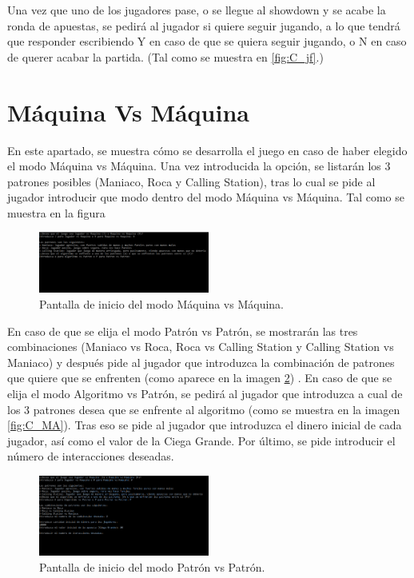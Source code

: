 Una vez que uno de los jugadores pase, o se llegue al showdown y se acabe la ronda de apuestas, se pedirá al jugador si quiere seguir jugando, a lo que tendrá que responder escribiendo Y en caso de que se quiera seguir jugando, o N en caso de querer acabar la partida. (Tal como se muestra en \ref{fig:C_jf}.)

\clearpage

\section{Máquina Vs Máquina}

En este apartado, se muestra cómo se desarrolla el juego en caso de haber elegido el modo Máquina vs Máquina. Una vez introducida la opción, se listarán los 3 patrones posibles (Maniaco, Roca y Calling Station), tras lo cual se pide al jugador introducir que modo dentro del modo Máquina vs Máquina. Tal como se muestra en la figura

\begin{figure}[h]
\centering
\includegraphics[width=0.5\textwidth]{figuras/C_M.png}   
\caption{Pantalla de inicio del modo Máquina vs Máquina.}
\label{fig:C_M}
\end{figure}

En caso de que se elija el modo Patrón vs Patrón, se mostrarán las tres combinaciones (Maniaco vs Roca, Roca vs Calling Station y Calling Station vs Maniaco) y después pide al jugador que introduzca la combinación de patrones que quiere que se enfrenten (como aparece en la imagen \ref{fig:C_MM}) . En caso de que se elija el modo Algoritmo vs Patrón, se pedirá al jugador que introduzca a cual de los 3 patrones desea que se enfrente al algoritmo (como se muestra en la imagen \ref{fig:C_MA}). Tras eso se pide al jugador que introduzca el dinero inicial de cada jugador, así como el valor de la Ciega Grande. Por último, se pide introducir el número de interacciones deseadas.

\begin{figure}[h]
\centering
\includegraphics[width=0.5\textwidth]{figuras/C_MM.png}   
\caption{Pantalla de inicio del modo Patrón vs Patrón.}
\label{fig:C_MM}
\end{figure}

